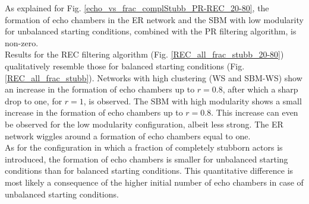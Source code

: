 \documentclass[11 pt , letterpaper , twoside , openright]{book}
\begin{document}
\newline
As explained for Fig. \ref{echo_vs_frac_complStubb_PR-REC_20-80}, the formation of echo chambers in the ER network and the SBM with low modularity for unbalanced starting conditions, combined with the PR filtering algorithm, is non-zero.\\
\newline
Results for the REC filtering algorithm (Fig. \ref{REC_all_frac_stubb_20-80}) qualitatively resemble those for balanced starting conditions (Fig. \ref{REC_all_frac_stubb}). Networks with high clustering (WS and SBM-WS) show an increase in the formation of echo chambers up to $r=0.8$, after which a sharp drop to one, for $r=1$, is observed. The SBM with high modularity shows a small increase in the formation of echo chambers up to $r = 0.8$. This increase can even be observed for the low modularity configuration, albeit less strong. The ER network wiggles around a formation of echo chambers equal to one.\\
\newline
As for the configuration in which a fraction of completely stubborn actors is introduced, the formation of echo chambers is smaller for unbalanced starting conditions than for balanced starting conditions. This quantitative difference is most likely a consequence of the higher initial number of echo chambers in case of unbalanced starting conditions.
\end{document}
